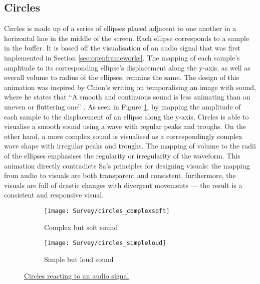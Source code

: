 \documentclass[../initial_thesis.tex]{subfiles}
\begin{document}
\subsection{Circles}
Circles is made up of a series of ellipses placed adjacent to one another in a horizontal line in the middle of the screen. Each ellipse corresponds to a sample in the buffer. It is based off the visualisation of an audio signal that was first implemented in Section \ref{sec:openframeworks}. The mapping of each sample's amplitude to its corresponding ellipse's displacement along the y-axis, as well as overall volume to radius of the ellipses, remains the same. The design of this animation was inspired by Chion's writing on temporalising an image with sound, where he states that ``A smooth and continuous sound is less animating than an uneven or fluttering one'' \cite{Chion1994}. As seen in Figure \ref{fig:circles1}, by mapping the amplitude of each sample to the displacement of an ellipse along the y-axis, Circles is able to visualise a smooth sound using a wave with regular peaks and troughs. On the other hand, a more complex sound is visualised as a correspondingly complex wave shape with irregular peaks and troughs. The mapping of volume to the radii of the ellipses emphasises the regularity or irregularity of the waveform. This animation directly contradicts Sa's principles for designing visuals: the mapping from audio to visuals are both transparent and consistent, furthermore, the visuals are full of drastic changes with divergent movements --- the result is a consistent and responsive visual.

\begin{figure}
  \begin{subfigure}{0.5\textwidth}
    \texttt{[image: Survey/circles\_complexsoft]}
    \caption{Complex but soft sound}
  \end{subfigure} 
  \begin{subfigure}{0.5\textwidth}
    \texttt{[image: Survey/circles\_simpleloud]}
    \caption{Simple but loud sound}
  \end{subfigure}
  \caption{\href{https://vimeo.com/326765323}{Circles reacting to an audio signal}}
  \label{fig:circles1}
\end{figure}
\end{document}
